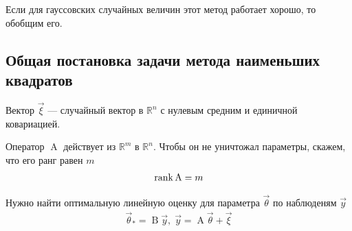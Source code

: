 Если для гауссовских случайных величин этот метод работает хорошо, то обобщим
его.

\subsection{Общая постановка задачи метода наименьших квадратов}

Вектор $\vec{\xi}$ --- случайный вектор в $\mathbb{R}^n$ с нулевым средним и
единичной ковариацией.

Оператор $\operatorname{A}$ действует из $\mathbb{R}^m$ в $\mathbb{R}^n$. Чтобы
он не уничтожал параметры, скажем, что его ранг равен $m$
\begin{align*}
    \operatorname{rank}{\operatorname{A}} = m
\end{align*}

Нужно найти оптимальную линейную оценку для параметра $\vec{\theta}$ по
наблюденям $\vec{y}$
\begin{align*}
    \vec{\theta}_* = \operatorname{B} \vec{y},\;
        \vec{y} = \operatorname{A} \vec{\theta} + \vec{\xi}
\end{align*}

